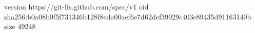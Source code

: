 version https://git-lfs.github.com/spec/v1
oid sha256:b0a08b0f5f731346b128f8eda00aef6e7d62def39929c403e89435d91163140b
size 49248
